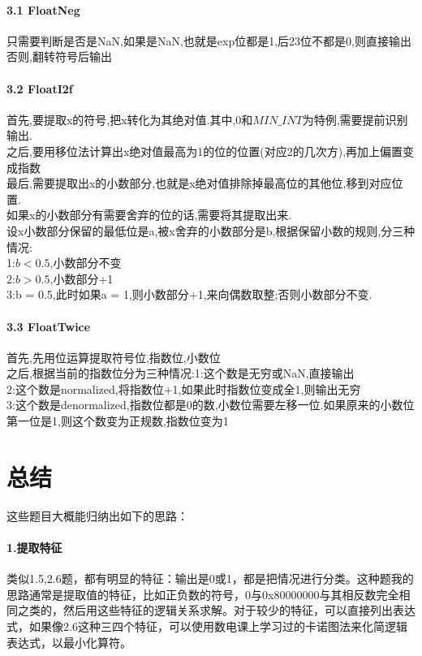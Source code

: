 \documentclass{article}
\begin{document}
\begin{CJK}{UTF8}{gkai}
\paragraph{3.1 FloatNeg} 
只需要判断是否是NaN,如果是NaN,也就是exp位都是1,后23位不都是0,则直接输出\\
否则,翻转符号后输出\\
\paragraph{3.2 FloatI2f} 
首先,要提取x的符号,把x转化为其绝对值.其中,0和$MIN\_INT$为特例,需要提前识别输出.\\
之后,要用移位法计算出x绝对值最高为1的位的位置(对应2的几次方),再加上偏置变成指数\\
最后,需要提取出x的小数部分,也就是x绝对值排除掉最高位的其他位,移到对应位置.\\
如果x的小数部分有需要舍弃的位的话,需要将其提取出来.\\
设x小数部分保留的最低位是a,被x舍弃的小数部分是b,根据保留小数的规则,分三种情况:\\
1:$b < 0.5$,小数部分不变\\
2:$b > 0.5$,小数部分+1\\
3:b = 0.5,此时如果a = 1,则小数部分+1,来向偶数取整;否则小数部分不变.\\

\paragraph{3.3 FloatTwice} 
首先,先用位运算提取符号位,指数位,小数位\\
之后,根据当前的指数位分为三种情况:1:这个数是无穷或NaN,直接输出\\
2:这个数是normalized,将指数位+1,如果此时指数位变成全1,则输出无穷\\
3:这个数是denormalized,指数位都是0的数,小数位需要左移一位.如果原来的小数位第一位是1,则这个数变为正规数,指数位变为1\\

\section{总结} 
这些题目大概能归纳出如下的思路：\\
\paragraph{1.提取特征}类似1.5,2.6题，都有明显的特征：输出是0或1，都是把情况进行分类。这种题我的思路通常是提取值的特征，比如正负数的符号，0与0x80000000与其相反数完全相同之类的，然后用这些特征的逻辑关系求解。对于较少的特征，可以直接列出表达式，如果像2.6这种三四个特征，可以使用数电课上学习过的卡诺图法来化简逻辑表达式，以最小化算符。

\end{CJK}
\end{document}
